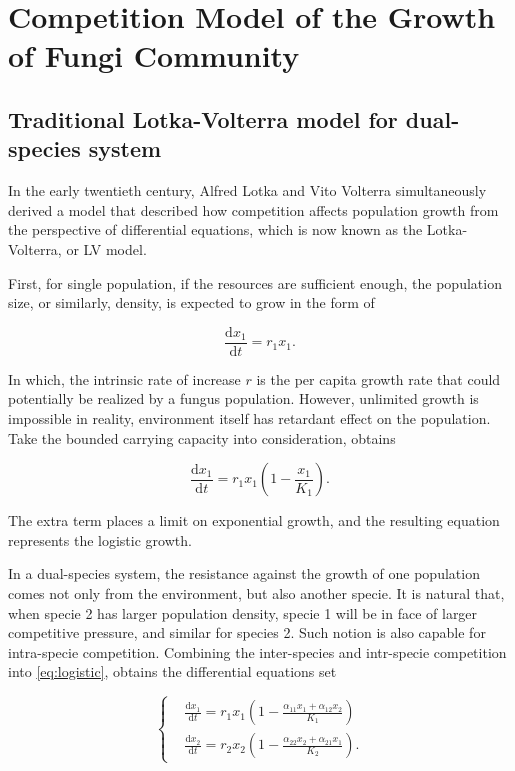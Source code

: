 \section{Competition Model of the Growth of Fungi Community}\label{sec:LV}


\subsection{Traditional Lotka-Volterra model for dual-species system}

In the early twentieth century, Alfred Lotka and Vito Volterra simultaneously derived a model that described how competition affects population growth from the perspective of differential equations, which is now known as the Lotka-Volterra, or LV model.

First, for single population, if the resources are sufficient enough, the population size, or similarly, density, is expected to grow in the form of

\begin{equation}\label{eq:exp}
    \frac{\mathrm{d}x_1}{\mathrm{d}t} = r_1x_1.
\end{equation}

In which, the intrinsic rate of increase $r$ is the per capita growth rate that could potentially be realized by a fungus population. However, unlimited growth is impossible in reality, environment itself has retardant effect on the population. Take the bounded carrying capacity into consideration, obtains

\begin{equation}\label{eq:logistic}
    \frac{\mathrm{d}x_1}{\mathrm{d}t} =
    r_1x_1\left(1 - \frac{x_1}{K_1}\right).
\end{equation}

The extra term places a limit on exponential growth, and the resulting equation represents the logistic growth.

In a dual-species system, the resistance against the growth of one population comes not only from the environment, but also another specie. It is natural that, when specie 2 has larger population density, specie 1 will be in face of larger competitive pressure, and similar for species 2. Such notion is also capable for intra-specie competition. Combining the inter-species and intr-specie competition into \eqref{eq:logistic}, obtains the differential equations set

\begin{equation}\label{eq:lv-dual}
    \left\{\begin{aligned}     &
        \frac{\mathrm{d}x_1}{\mathrm{d}t} =
        r_1x_1\left(1 - \frac{\alpha_{11}x_1 + \alpha_{12}x_2}{K_1}\right) \\ &
        \frac{\mathrm{d}x_2}{\mathrm{d}t} =
        r_2x_2\left(1 - \frac{\alpha_{22}x_2 + \alpha_{21}x_1}{K_2}\right).
    \end{aligned}\right.
\end{equation}

